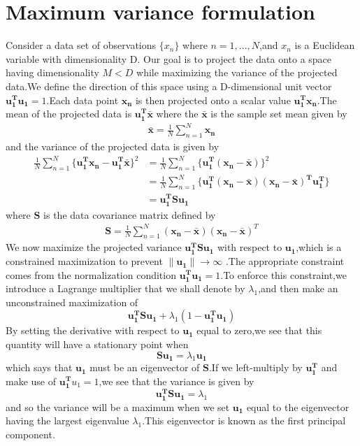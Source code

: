 \section{Maximum variance formulation}
Consider a data set of observations $\{x_n\}$ where $n = 1,...,N$,and $x_n$ is a Euclidean variable with dimensionality D.
Our goal is to project the data onto a space having dimensionality $M < D$ while maximizing the variance of the projected
data.We define the direction of this space using a D-dimensional unit vector $\mathbf{u_1^T}\mathbf{u_1} = 1$.Each 
data point $\mathbf{x_n}$ is then projected onto a scalar value $\mathbf{u_1^T}\mathbf{x_n}$.The mean of the projected 
data is $\mathbf{u_1^T}\bar{\mathbf{x}}$ where the $\bar{\mathbf{x}}$ is the sample set mean given by
\begin{align}
\bar{\mathbf{x}} = \frac{1}{N}\sum_{n=1}^{N}{\mathbf{x_n}}
\end{align}                                  
and the variance of the projected data is given by
\begin{align}
\frac{1}{N}\sum_{n=1}^{N}\{\mathbf{u_1^T}\mathbf{x_n} - \mathbf{u_1^T}\bar{\mathbf{x}}\}^2 
&= \frac{1}{N}\sum_{n=1}^{N}{\{\mathbf{u_1^T}(\mathbf{x_n} - \bar{\mathbf{x}})\}^2} \\
&= \frac{1}{N}\sum_{n=1}^{N}{\{\mathbf{u_1^T(\mathbf{x_n - \bar{\mathbf{x}}})(\mathbf{x_n -\bar{x}})^T\mathbf{u_1^T} }  \}} \\
&= \mathbf{u_1^T}\mathbf{S}\mathbf{u_1}
\end{align}
where $\mathbf{S}$ is the data covariance matrix defined by
\begin{align}
\mathbf{S} = \frac{1}{N}\sum_{n=1}^{N}(\mathbf{x_n}-\bar{\mathbf{x}})(\mathbf{x_n}-\mathbf{\bar{x}})^T
\end{align}
We now maximize the projected variance $\mathbf{u_1^T}\mathbf{S}\mathbf{u_1}$ with respect to $\mathbf{u_1}$,which is a
constrained maximization to prevent $\parallel\mathbf{u_1}\parallel\rightarrow \infty$ .The appropriate constraint 
comes from the normalization condition $\mathbf{u_1^T}\mathbf{u_1}=1$.To enforce this constraint,we introduce a 
Lagrange multiplier that we shall denote by $\lambda_1$,and then make an unconstrained maximization of
\begin{equation}
\mathbf{u_1^T}\mathbf{S}\mathbf{u_1} + \lambda_1(1-\mathbf{u_1^T}\mathbf{u_1})
\end{equation}
By setting the derivative with respect to $\mathbf{u_1}$ equal to zero,we see that this quantity will have a stationary
point when
\begin{equation}
\mathbf{S}\mathbf{u_1} = \lambda_1\mathbf{u_1}
\end{equation}
which says that $\mathbf{u_1}$ must be an eigenvector of $\mathbf{S}$.If we left-multiply by $\mathbf{u_1^T}$ and make use
of $\mathbf{u_1^T}{u_1} = 1$,we see that the variance is given by
\begin{equation}
\mathbf{u_1^TSu_1} = \lambda_1
\end{equation}
and so the variance will be a maximum when we set $\mathbf{u_1}$ equal to the eigenvector having the largest 
eigenvalue $\lambda_1$.This eigenvector is known as the first principal component.

